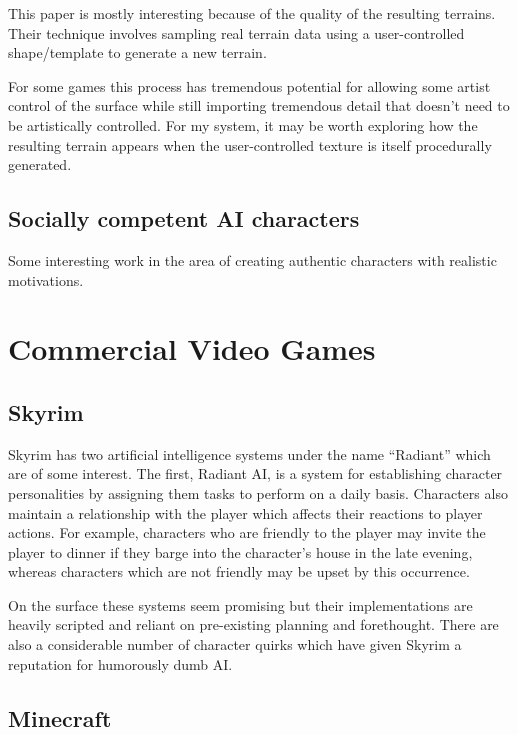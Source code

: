 This paper is mostly interesting because of the quality of the resulting terrains.
Their technique involves sampling real terrain data using a user-controlled shape/template to generate a new terrain.

For some games this process has tremendous potential for allowing some artist control of the surface while still importing tremendous detail that doesn't need to be artistically controlled.
For my system, it may be worth exploring how the resulting terrain appears when the user-controlled texture is itself procedurally generated.

\subsection{Socially competent AI characters}

Some interesting work in the area of creating authentic characters with realistic motivations. \cite{socially_competent}

\section{Commercial Video Games}

\subsection{Skyrim}

Skyrim has two artificial intelligence systems under the name ``Radiant'' which are of some interest. The first, Radiant AI, is a system for establishing character personalities by assigning them tasks to perform on a daily basis. Characters also maintain a relationship with the player which affects their reactions to player actions. For example, characters who are friendly to the
player may invite the player to dinner if they barge into the character's house in the late evening, whereas characters which are not friendly may be upset by this occurrence.

On the surface these systems seem promising but their implementations are heavily scripted and reliant on pre-existing planning and forethought. There are also a considerable number of character quirks which have given Skyrim a reputation for humorously dumb AI. \cite{skyrim_gamespy} \cite{skyrim_ign} \cite{gameinformer_skyrimtech} \cite{skyrim_nesmith_radiant} \cite{skyrim_whatsnew}

\subsection{Minecraft}

